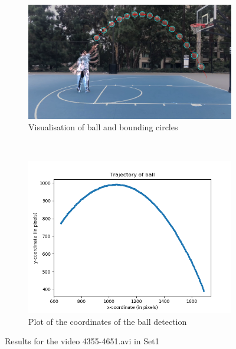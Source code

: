 \documentclass[12pt]{article}
\begin{document}
\begin{figure}[H]
    \centering
    \begin{subfigure}[b]{0.7\textwidth}
         \centering
         \includegraphics[width=\textwidth]{../results/visualisations/output_Set1_4355-4651.png}
         \caption{Visualisation of ball and bounding circles}
         \label{fig:y equals x}
     \end{subfigure}\\
     \begin{subfigure}[b]{0.7\textwidth}
         \centering
         \includegraphics[width=\textwidth]{../results/plots/Set1_4355-4651.png}
         \caption{Plot of the coordinates of the ball detection}
         \label{fig:three sin x}
     \end{subfigure}
     \caption{Results for the video 4355-4651.avi in Set1}
\end{figure}
\end{document}
